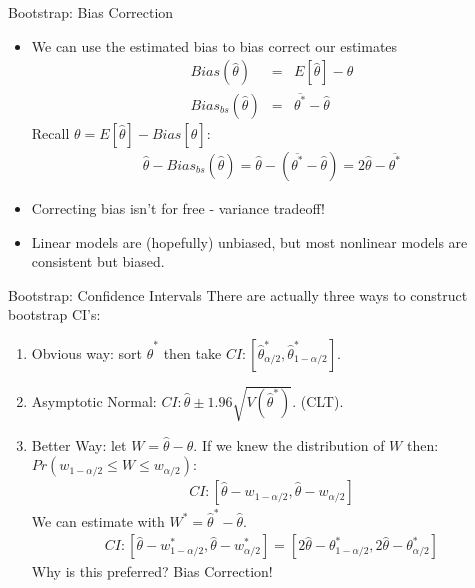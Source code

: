 \documentclass[aspectratio=169]{beamer}
\begin{document}
\begin{frame}{Bootstrap: Bias Correction}
\begin{itemize}
\item We can use the estimated bias to \alert{bias correct} our estimates
\begin{eqnarray*}
Bias(\hat{\theta}) &=&E[\hat{\theta}] - \theta \\
Bias_{bs}(\hat{\theta}) &=&\overline{\theta^{*}} -\hat{\theta}
\end{eqnarray*}
Recall $\theta = E[\hat{\theta}] - Bias[\hat{\theta}]$:
\begin{eqnarray*}
\hat{\theta}- Bias_{bs}(\hat{\theta}) = \hat{\theta}-(\overline{\theta^{*}}-\hat{\theta}) = 2 \hat{\theta} - \overline{\theta^{*}}
\end{eqnarray*}
\item Correcting bias isn't for free - variance tradeoff!
\item Linear models are (hopefully) unbiased, but most nonlinear models are \alert{consistent but biased}.
\end{itemize}

\end{frame}

\begin{frame}{Bootstrap: Confidence Intervals}
There are actually three ways to construct bootstrap CI's:
\begin{enumerate}
\item Obvious way: sort  $\hat{\theta}^{*}$ then take $CI: [\hat{\theta}^{*}_{\alpha/2},\hat{\theta}^{*}_{1-\alpha/2}]$.
\item Asymptotic Normal:  $CI: \hat{\theta} \pm 1.96 \sqrt{V(\hat{\theta}^{*})}$. (CLT).
\item Better Way: let $W= \hat{\theta} -\theta$. If we knew the distribution of $W$ then: $Pr(w_{1-\alpha/2} \leq W \leq w_{\alpha/2})$:
\begin{eqnarray*}
CI: [\hat{\theta} -w_{1-\alpha/2}, \hat{\theta} -w_{\alpha/2}]
\end{eqnarray*}
We can estimate with $W^{*} = \hat{\theta}^{*} - \hat{\theta}$.
\begin{eqnarray*}
CI: [\hat{\theta} -w^*_{1-\alpha/2}, \hat{\theta} -w^*_{\alpha/2}] = [2 \hat{\theta} -\theta^*_{1-\alpha/2}, 2 \hat{\theta} -\theta^*_{\alpha/2}]
\end{eqnarray*}
Why is this preferred? Bias Correction!
\end{enumerate}

\end{frame}
\end{document}
